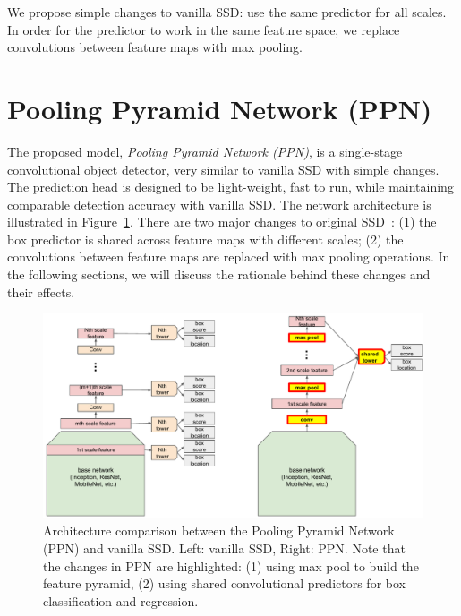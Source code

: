 \documentclass[10pt,twocolumn,letterpaper]{article}
\begin{document}
We propose simple changes to vanilla SSD: use the same predictor
for all scales. In order for the predictor to work in the
same feature space, we replace convolutions between
feature maps with max pooling.










\section{Pooling Pyramid Network (PPN)}
The proposed model, \textit{Pooling Pyramid Network (PPN)},
is a single-stage convolutional object detector, very
similar to vanilla SSD with simple changes.  The prediction head is
designed to be light-weight, fast to run, while maintaining
comparable detection accuracy with vanilla SSD.
The network architecture is illustrated in
Figure~\ref{fig:ppn}.  There are two major changes to
original SSD~\cite{liu2016ssd}: (1) the box predictor is
shared across feature maps with different scales; (2) the
convolutions between feature maps are replaced with max
pooling operations.  In the following sections, we will
discuss the rationale behind these changes and their effects.

\begin{figure}[t]
\begin{center}
\includegraphics[width=1.0\linewidth]{figure/ppn_vs_ssd.pdf}
\end{center}
\caption{
Architecture comparison between the Pooling Pyramid Network (PPN)
and vanilla SSD. Left: vanilla SSD, Right: PPN.
Note that the changes in PPN are highlighted:
(1) using max pool to build the feature pyramid,
(2) using shared convolutional predictors for box classification and regression.
}
\label{fig:ppn}
\end{figure}
\end{document}
